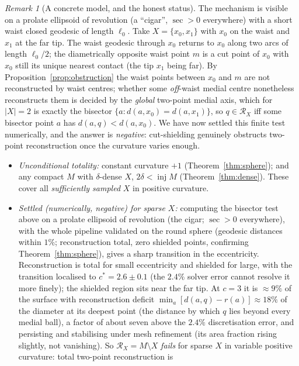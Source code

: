 \documentclass[11pt]{article}
\theoremstyle{remark}
\newtheorem{remark}[theorem]{Remark}
\newcommand{\X}{X}
\newcommand{\Rx}{\mathcal{R}_{\X}}
\newcommand{\inj}{\operatorname{inj}}
\begin{document}
\begin{remark}[A concrete model, and the honest status]\label{rem:cigar}
The mechanism is visible on a prolate ellipsoid of revolution
(a ``cigar'', $\sec>0$ everywhere) with a short waist closed geodesic of
length $\ell_{0}$. Take $\X=\{x_{0},x_{1}\}$ with $x_{0}$ on the waist and
$x_{1}$ at the far tip. The waist geodesic through $x_{0}$ returns to
$x_{0}$ along two arcs of length $\ell_{0}/2$; the diametrically opposite
waist point $m$ is a cut point of $x_{0}$ with $x_{0}$ still its unique
nearest contact (the tip $x_{1}$ being far). By
Proposition~\ref{prop:obstruction} the waist points between $x_{0}$ and
$m$ are not reconstructed by waist centres; whether some \emph{off}-waist
medial centre nonetheless reconstructs them is decided by the
\emph{global} two-point medial axis, which for $|\X|=2$ is exactly the
bisector $\{a:d(a,x_{0})=d(a,x_{1})\}$, so $q\in\Rx$ iff some bisector
point $a$ has $d(a,q)<d(a,x_{0})$. We have now settled this finite test
numerically, and the answer is \emph{negative}: cut-shielding genuinely
obstructs two-point reconstruction once the curvature varies enough.
\begin{itemize}
\item \emph{Unconditional totality:} constant curvature $+1$
(Theorem~\ref{thm:sphere}); and any compact $M$ with $\delta$-dense $\X$,
$2\delta<\inj M$ (Theorem~\ref{thm:dense}). These cover all
\emph{sufficiently sampled} $\X$ in positive curvature.
\item \emph{Settled (numerically, negative) for sparse $\X$:} computing the
bisector test above on a prolate ellipsoid of revolution (the cigar;
$\sec>0$ everywhere), with the whole pipeline validated on the round sphere
(geodesic distances within $1\%$; reconstruction total, zero shielded
points, confirming Theorem~\ref{thm:sphere}), gives a sharp transition in
the eccentricity. Reconstruction is total for small eccentricity and
shielded for large, with the transition localised to $c^{\ast}=2.6\pm0.1$
(the $2.4\%$ solver error cannot resolve it more finely); the shielded
region sits near the far tip. At $c=3$ it is $\approx9\%$ of the surface
with reconstruction deficit $\min_{a}[d(a,q)-r(a)]\approx18\%$ of the
diameter at its deepest point (the distance by which $q$ lies beyond every
medial ball), a factor of about seven above the $2.4\%$ discretisation
error, and persisting and stabilising under mesh refinement (its area
fraction rising slightly, not vanishing). So $\Rx=M\setminus\X$ \emph{fails}
for sparse
$\X$ in variable positive curvature: total two-point reconstruction is

\end{itemize}
\end{remark}
\end{document}
